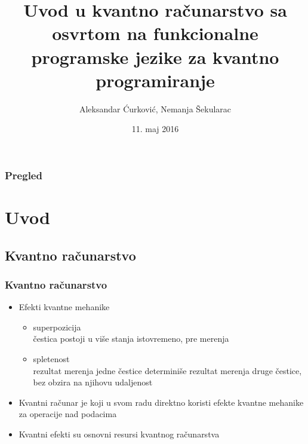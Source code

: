 \documentclass[12pt,hyperref={unicode}]{beamer}
\title[Short title]{Uvod u kvantno računarstvo sa osvrtom na funkcionalne programske jezike za kvantno programiranje} %
\author{Aleksandar Ćurković, Nemanja Šekularac} %
\institute %
{
Matematički fakultet \\ %
\medskip
\textit{nsekularac@gmail.com, curkovical@gmail.com} %
}
\date{11. maj 2016} %
\begin{document}
\begin{frame}
\titlepage %
\end{frame}

\begin{frame}
\frametitle{Pregled} %
\tableofcontents %
\end{frame}


\section{Uvod} %

\subsection{Kvantno računarstvo}%


\begin{frame}
\frametitle{Kvantno računarstvo}
\begin{itemize}

\item{Efekti kvantne mehanike}
	\begin{itemize}
    \item{superpozicija}\\
	čestica postoji u više stanja istovremeno, pre merenja
    \item{spletenost}\\
	rezultat merenja jedne čestice determiniše rezultat merenja druge čestice, bez obzira na njihovu udaljenost
    \end{itemize}
\item{Kvantni računar je koji u svom radu direktno koristi efekte kvantne mehanike za operacije nad podacima}
\item{Kvantni efekti su osnovni resursi kvantnog računarstva}
\end{itemize}

\end{frame}
\end{document}
